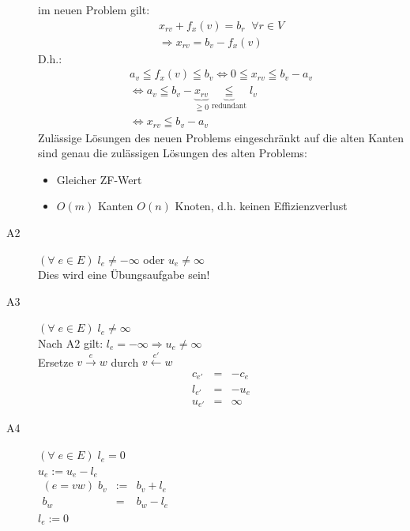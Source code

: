 \begin{description}
im neuen Problem gilt:
\[\begin{array}{l}x_{r v} + f_{x}(v) = b_{r} \; \; \forall r \in V\\
\Rightarrow x_{r v} = b_{v} -f_{x}(v)\end{array}\]
D.h.:\\
\[\begin{array}{l}a_{v} \leqq f_{x}(v) \leqq b_{v} \Leftrightarrow 0 \leqq x_{r v} \leqq b_{v} -
a_{v}\\
\Leftrightarrow a_{v} \leqq b_{v} - \underbrace{x_{r v}}_{\geqq 0}
\underbrace{\leqq}_{\mbox{redundant}} l_{v}\\
\Leftrightarrow x_{r v} \leqq b_{v} - a_{v}
\end{array}\]
Zulässige Lösungen des neuen Problems eingeschränkt auf die alten Kanten
sind genau die zulässigen Lösungen des alten Problems:
\begin{itemize}
\item Gleicher ZF-Wert
\item $O(m)$ Kanten $O(n)$ Knoten, d.h. keinen Effizienzverlust
\end{itemize}
\item[A2] $(\forall \; e \in E) \; l_{e} \neq -\infty$ oder $u_{e} \neq
\infty$\\ Dies wird eine Übungsaufgabe sein!
\item[A3] $(\forall \; e \in E)\;  l_{e} \neq \infty$\\
Nach A2 gilt: $l_{e} = -\infty \Rightarrow u_{e} \neq \infty$\\
Ersetze $v\stackrel{e}{\rightarrow}w$ durch $v\stackrel{e'}{\leftarrow}w$
\[\begin{array}{lcl}
c_{e'}&=& -c_{e}\\
l_{e'} &=& -u_{e}\\
u_{e'} &=& \infty
\end{array}\]
\item[A4] $(\forall \; e \in E)\; l_{e} = 0$\\
$u_{e} := u_{e} - l_{e}$\\
$\begin{array}{rcl}(e=vw) \; b_{v} &:=& b_{v} + l_{e}\\
b_{w} &=& b_{w} - l_{e} \end{array}$\\
$l_{e} := 0$


\end{description}
